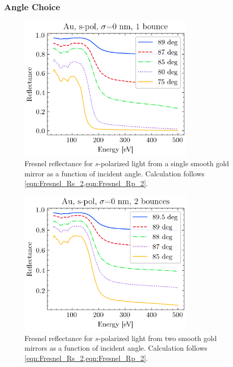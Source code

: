 \subsubsection{Angle Choice}
\begin{figure}
	\centering
	\includegraphics[width=0.75\textwidth]{figures/chap2/Au_ReflvsAngle.png}
	\caption{Fresnel reflectance for $s$-polarized light from a single smooth gold mirror as a function of incident angle. Calculation follows \cref{eqn:Fresnel_Rs_2,eqn:Fresnel_Rp_2}.}
	\label{fig:Au_ReflvsAngle}
\end{figure}

\begin{figure}
	\centering
	\includegraphics[width=0.75\textwidth]{figures/chap2/Au_ReflvsAngle_2bounce.png}
	\caption{Fresnel reflectance for $s$-polarized light from two smooth gold mirrors as a function of incident angle. Calculation follows \cref{eqn:Fresnel_Rs_2,eqn:Fresnel_Rp_2}.}
	\label{fig:Au_ReflvsAngle_2bounce}
\end{figure}

